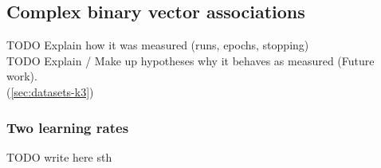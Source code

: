 

\subsection{Complex binary vector associations} 
\label{sec:results-k3}

TODO Explain how it was measured (runs, epochs, stopping) \\
TODO Explain / Make up hypotheses why it behaves as measured (Future work). \\

(\ref{sec:datasets-k3}) 


\subsubsection{Two learning rates} 
\label{sec:tlr-k3}
TODO write here sth 


